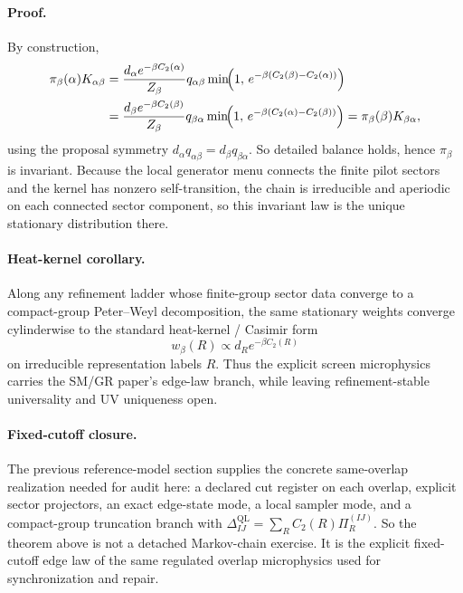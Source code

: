 \documentclass[11pt]{article}
\begin{document}
\paragraph{Proof.}
By construction,
\begin{align}
\pi_\beta(\alpha)K_{\alpha\beta}
&=
\frac{d_\alpha e^{-\beta C_2(\alpha)}}{Z_\beta}
q_{\alpha\beta}
\min\!\Bigl(
1,\,
e^{-\beta(C_2(\beta)-C_2(\alpha))}
\Bigr)\\
&=
\frac{d_\beta e^{-\beta C_2(\beta)}}{Z_\beta}
q_{\beta\alpha}
\min\!\Bigl(
1,\,
e^{-\beta(C_2(\alpha)-C_2(\beta))}
\Bigr)
=
\pi_\beta(\beta)K_{\beta\alpha},
\end{align}
using the proposal symmetry $d_\alpha q_{\alpha\beta}=d_\beta q_{\beta\alpha}$. So detailed
balance holds, hence $\pi_\beta$ is invariant. Because the local generator menu connects the
finite pilot sectors and the kernel has nonzero self-transition, the chain is irreducible and
aperiodic on each connected sector component, so this invariant law is the unique stationary
distribution there.

\paragraph{Heat-kernel corollary.}
Along any refinement ladder whose finite-group sector data converge to a compact-group
Peter--Weyl decomposition, the same stationary weights converge cylinderwise to the standard
heat-kernel / Casimir form
\begin{equation}
w_\beta(R)\propto d_R e^{-\beta C_2(R)}
\end{equation}
on irreducible representation labels $R$. Thus the explicit screen microphysics carries the
SM/GR paper's edge-law branch, while leaving refinement-stable
universality and UV uniqueness open.

\paragraph{Fixed-cutoff closure.}
The previous reference-model section supplies the concrete same-overlap realization needed for
audit here: a declared cut register on each overlap, explicit sector projectors, an exact
edge-state mode, a local sampler mode, and a compact-group truncation branch with
$\Delta_{IJ}^{\mathrm{QL}}=\sum_R C_2(R)\Pi_R^{(IJ)}$. So the theorem above is not a detached
Markov-chain exercise. It is the explicit fixed-cutoff edge law of the same regulated overlap
microphysics used for synchronization and repair.
\end{document}
